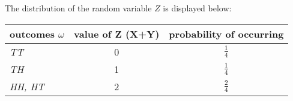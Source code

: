 \documentclass[11pt]{article}
\begin{document}
\begin{solution}
\begin{Parts}
\Part The distribution of the random variable $Z$ is displayed below:

\begin{center}
    \begin{tabular}{|>{\centering\arraybackslash}m{6cm}|c|c|}
    \hline
    \textbf{outcomes $\omega$} & \textbf{value of Z (X+Y)} & 
    \textbf{probability of occurring} \\
    \hline
    \textit{TT} & 0 & $\frac{1}{4}$ \\
    \hline
    \textit{TH} & 1 & $\frac{1}{4}$ \\
    \hline
    \textit{HH, HT} & 2 & $\frac{2}{4}$ \\
    \hline
    \end{tabular}
\end{center}

\end{Parts}

\end{solution}

\end{document}
